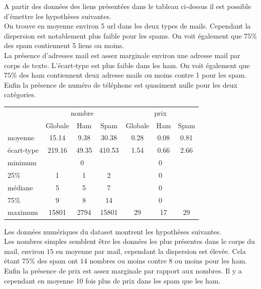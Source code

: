 \documentclass[a4paper,12pt]{article}
\begin{document}
				A partir des données des liens présentées dans le tableau ci-dessus il est possible d'émettre les hypothèses suivantes.\\
				On trouve en moyenne environ 5 url dans les deux types de mails. Cependant la dispersion est notablement plus faible pour les spams. On voit également que $75\%$ des spam contiennent 5 liens ou moins. \\
				La présence d'adresses mail est assez marginale environ une adresse mail par corps de texte. L'écart-type est plus faible dans les ham. On voit également que $75\%$ des ham contiennent deux adresse mails ou moins contre 1 pour les spam.\\
				Enfin la présence de numéro de téléphone est quasiment nulle pour les deux catégories. 
				
				\begin{table}[H]
					\centering
					 \label{tab:p1nb}
					\begin{tabular}{|l|c|c|c|c|c|c|}
						\hline
						 	& \multicolumn{3}{|c|}{nombre} & \multicolumn{3}{|c|}{prix} \\
						 	& Globale & Ham & Spam & Globale & Ham & Spam \\
						\hline
						moyenne    & 15.14 & 9.38 & 30.38 & 0.28 & 0.08 & 0.81\\
						\hline
						écart-type & 219.16 & 49.35 & 410.53    & 1.54 & 0.66 & 2.66 \\
						\hline
						minimum    & \multicolumn{3}{|c|}{0} & \multicolumn{3}{|c|}{0} \\
						\hline
						25\%       & 1 & 1 & 2      & \multicolumn{3}{|c|}{0} \\
						\hline
						médiane    & 5 & 5 & 7     & \multicolumn{3}{|c|}{0} \\
						\hline
						75\%       & 9 & 8 & 14     & \multicolumn{3}{|c|}{0} \\
						\hline
						maximum    & 15801 & 2794 & 15801  & 29 & 17 & 29 \\
						\hline
					\end{tabular}
				\end{table}
				
				Les données numériques du dataset montrent les hypothèses suivantes.\\
				Les nombres simples semblent être les données les plus présentes dans le corps du mail, environ $15$ en moyenne par mail, cependant la dispersion est élevée. Cela étant $75\%$ des spam ont $14$ nombres ou moins contre $8$ ou moins pour les ham.\\
				Enfin la présence de prix est assez marginale par rapport aux nombres. Il y a cependant en moyenne 10 fois plus de prix dans les spam que les ham.\\
			
\end{document}
